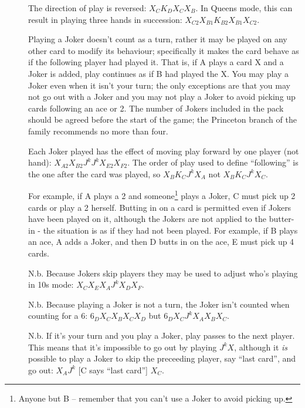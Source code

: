 \documentclass[12pt]{article}
\begin{document}
\begin{description}
  \item[]
    The direction of play is reversed: $X_C K_D X_C X_B$.  In Queens mode, this can result in playing
    three hands in succession: $X_{C2} X_{B1} K_{B2} X_{B1} X_{C2}$.

  \item[]

    Playing a Joker doesn't count as a turn, rather it may be played on any other card to modify its
    behaviour; specifically it makes the card behave as if the following player had played it. That is, if A
    plays a card X and a Joker is added, play continues as if B had played the X.  You may play a Joker even
    when it isn't your turn; the only exceptions are that you may not go out with a Joker and you may not play
    a Joker to avoid picking up cards following an ace or 2.  The number of Jokers included in the pack should
    be agreed before the start of the game; the Princeton branch of the family recommends no more than four.

    Each Joker played has the effect of moving play forward by one player (not hand): $X_{A2} X_{B2} J^k J^k
    X_{E2} X_{F2}$.  The order of play used to define ``following'' is the one after the card was played, so
    $X_B K_C J^k X_A$ not $X_B K_C J^k X_C$.

    For example, if A plays a 2 and someone\footnote{Anyone but B -- remember that you can't use a
      Joker to avoid picking up.} plays a Joker, C must pick up 2 cards or play a 2 herself.  Butting in on a
    card is permitted even if Jokers have been played on it, although the Jokers are not applied to the butter-in - the situation is as if they had not been played.  For
    example, if B plays an ace, A adds a Joker, and then D butts in on the ace, E must pick up 4 cards.

    N.b. Because Jokers skip players they may be used to adjust who's playing in 10s mode:
    $X_C X_E X_A J^k X_D X_F$.

    N.b. Because playing a Joker is not a turn, the Joker isn't counted when counting for a 6:
    $6_D X_C X_B X_C X_D$ but $6_D X_C J^k X_A X_B X_C$.

    N.b. If it's your turn and you play a Joker, play passes to the next player.  This means that it's
    impossible to go out by playing $J^k X$, although it \textit{is} possible to play a Joker to skip the
    preceeding player, say ``last card'', and go out: $X_A J^k$ [C says ``last card''] $X_C$.
\end{description}
\end{document}
